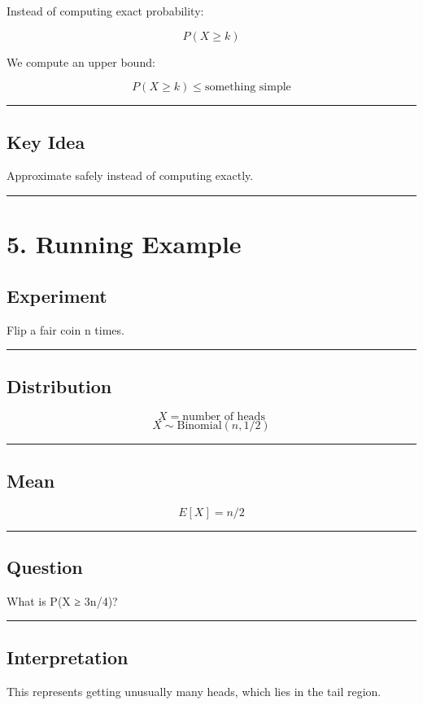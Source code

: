 \documentclass[12pt]{article}
\begin{document}
Instead of computing exact probability:

\[
P(X \geq k)
\]

We compute an upper bound:

\[
P(X \geq k) \leq \text{something simple}
\]

\hrule

\subsection*{Key Idea}

Approximate safely instead of computing exactly.

\hrule

\section*{5. Running Example}

\subsection*{Experiment}

Flip a fair coin n times.

\hrule

\subsection*{Distribution}

\[
X = \text{number of heads}
\]
\[
X \sim \text{Binomial}(n, 1/2)
\]

\hrule

\subsection*{Mean}

\[
E[X] = n/2
\]

\hrule

\subsection*{Question}

What is P(X ≥ 3n/4)?

\hrule

\subsection*{Interpretation}

This represents getting unusually many heads, which lies in the tail region.
\end{document}
